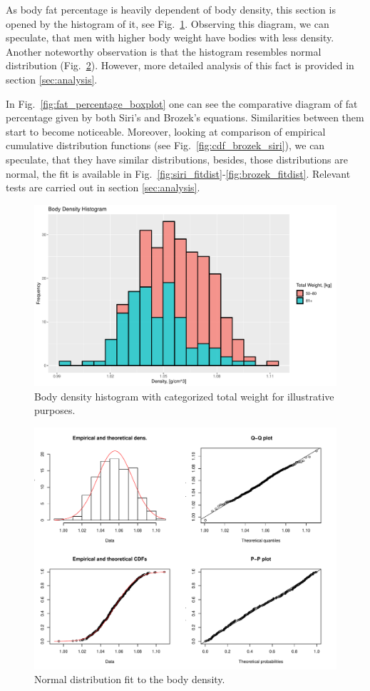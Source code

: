 \documentclass[11pt,american,american]{article}
\begin{document}
As body fat percentage is heavily dependent of body density, this section is opened by the histogram of it, see Fig.~\ref{fig:body_density_histogram}. Observing this diagram, we can speculate, that men with higher body weight have bodies with less density. Another noteworthy observation is that the histogram resembles normal distribution (Fig.~\ref{fig:density_fitdist}). However, more detailed analysis of this fact is provided in section \ref{sec:analysis}.

\medskip

In Fig.~\ref{fig:fat_percentage_boxplot} one can see the comparative diagram of fat percentage given by both Siri's and Brozek's equations. Similarities between them start to become noticeable. Moreover, looking at comparison of empirical cumulative distribution functions (see Fig.~\ref{fig:cdf_brozek_siri}), we can speculate, that they have similar distributions, besides, those distributions are normal, the fit is available in Fig.~\ref{fig:siri_fitdist}-\ref{fig:brozek_fitdist}. Relevant tests are carried out in section \ref{sec:analysis}.

\newpage

\vspace*{\fill}
\begin{figure}[H]
	\centering
	\includegraphics[width=0.75\linewidth]{Images/FIGURES/body_density_histogram}
	\caption{Body density histogram with categorized total weight for illustrative purposes.}
	\label{fig:body_density_histogram}
\end{figure}

\begin{figure}[H]
	\centering
	\includegraphics[width=0.8\linewidth]{Images/FIGURES/density_fitdist}
	\caption{Normal distribution fit to the body density.}
	\label{fig:density_fitdist}
\end{figure}
\vspace*{\fill}
\end{document}
